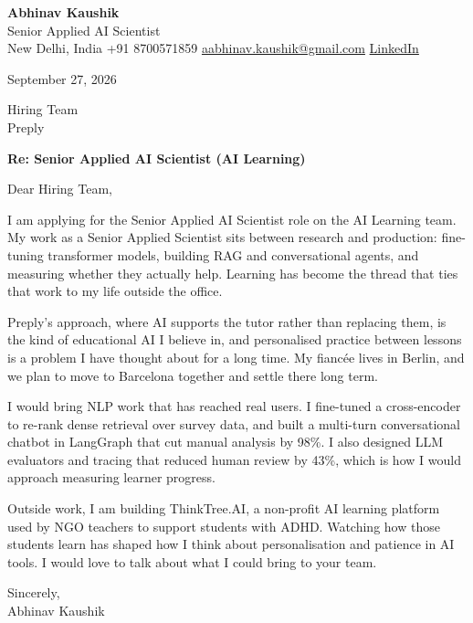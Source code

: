 \documentclass[11pt,a4paper]{article}
\begin{document}
{\Large\bfseries Abhinav Kaushik}\\
Senior Applied AI Scientist\\
New Delhi, India \textbar{} +91 8700571859 \textbar{} \href{mailto:aabhinav.kaushik@gmail.com}{aabhinav.kaushik@gmail.com} \textbar{} \href{https://www.linkedin.com/in/abhinav-kaushik10/}{LinkedIn}  

September 27, 2026

Hiring Team\\
Preply

\textbf{Re: Senior Applied AI Scientist (AI Learning)}

Dear Hiring Team,

I am applying for the Senior Applied AI Scientist role on the AI Learning team. My work as a Senior Applied Scientist sits between research and production: fine-tuning transformer models, building RAG and conversational agents, and measuring whether they actually help. Learning has become the thread that ties that work to my life outside the office.

Preply's approach, where AI supports the tutor rather than replacing them, is the kind of educational AI I believe in, and personalised practice between lessons is a problem I have thought about for a long time. My fiancée lives in Berlin, and we plan to move to Barcelona together and settle there long term.

I would bring NLP work that has reached real users. I fine-tuned a cross-encoder to re-rank dense retrieval over survey data, and built a multi-turn conversational chatbot in LangGraph that cut manual analysis by 98\%. I also designed LLM evaluators and tracing that reduced human review by 43\%, which is how I would approach measuring learner progress.

Outside work, I am building ThinkTree.AI, a non-profit AI learning platform used by NGO teachers to support students with ADHD. Watching how those students learn has shaped how I think about personalisation and patience in AI tools. I would love to talk about what I could bring to your team.

Sincerely,\\[4pt]
Abhinav Kaushik
\end{document}
